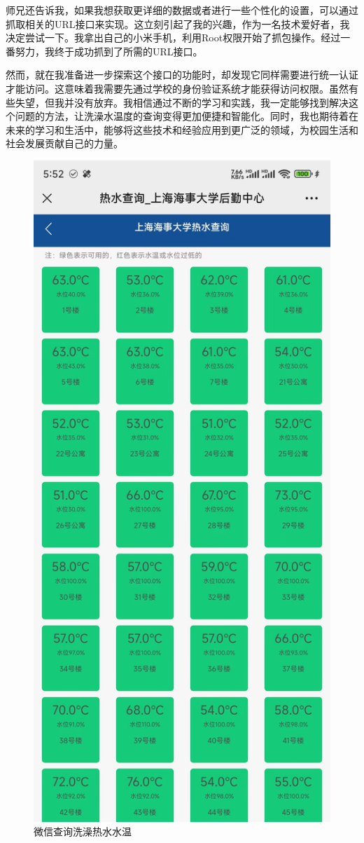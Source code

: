 师兄还告诉我，如果我想获取更详细的数据或者进行一些个性化的设置，可以通过抓取相关的URL接口来实现。这立刻引起了我的兴趣，作为一名技术爱好者，我决定尝试一下。我拿出自己的小米手机，利用Root权限开始了抓包操作。经过一番努力，我终于成功抓到了所需的URL接口。

然而，就在我准备进一步探索这个接口的功能时，却发现它同样需要进行统一认证才能访问。这意味着我需要先通过学校的身份验证系统才能获得访问权限。虽然有些失望，但我并没有放弃。我相信通过不断的学习和实践，我一定能够找到解决这个问题的方法，让洗澡水温度的查询变得更加便捷和智能化。同时，我也期待着在未来的学习和生活中，能够将这些技术和经验应用到更广泛的领域，为校园生活和社会发展贡献自己的力量。

\begin{figure}
	\centering
	\includegraphics[width=0.6\linewidth]{Resources/Picture/wechat_hot_water}
	\caption{微信查询洗澡热水水温}
	\label{fig:wechathotwater}
\end{figure}

